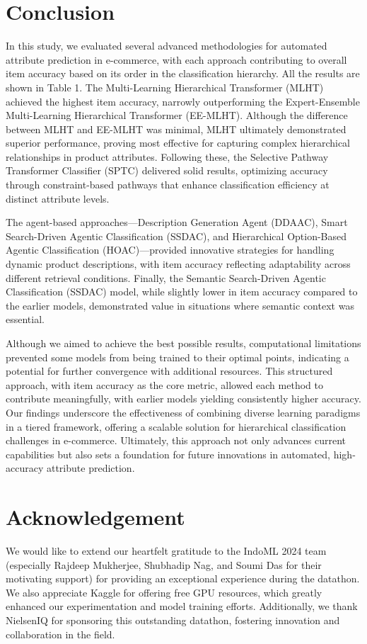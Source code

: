\documentclass[9pt,a4paper,twoside]{rho-class/rho}
\begin{document}
\section{Conclusion}
In this study, we evaluated several advanced methodologies for automated attribute prediction in e-commerce, with each approach contributing to overall item accuracy based on its order in the classification hierarchy. All the results are shown in Table 1. The Multi-Learning Hierarchical Transformer (MLHT) achieved the highest item accuracy, narrowly outperforming the Expert-Ensemble Multi-Learning Hierarchical Transformer (EE-MLHT). Although the difference between MLHT and EE-MLHT was minimal, MLHT ultimately demonstrated superior performance, proving most effective for capturing complex hierarchical relationships in product attributes. Following these, the Selective Pathway Transformer Classifier (SPTC) delivered solid results, optimizing accuracy through constraint-based pathways that enhance classification efficiency at distinct attribute levels.

The agent-based approaches—Description Generation Agent (DDAAC), Smart Search-Driven Agentic Classification (SSDAC), and Hierarchical Option-Based Agentic Classification (HOAC)—provided innovative strategies for handling dynamic product descriptions, with item accuracy reflecting adaptability across different retrieval conditions. Finally, the Semantic Search-Driven Agentic Classification (SSDAC) model, while slightly lower in item accuracy compared to the earlier models, demonstrated value in situations where semantic context was essential.

Although we aimed to achieve the best possible results, computational limitations prevented some models from being trained to their optimal points, indicating a potential for further convergence with additional resources. This structured approach, with item accuracy as the core metric, allowed each method to contribute meaningfully, with earlier models yielding consistently higher accuracy. Our findings underscore the effectiveness of combining diverse learning paradigms in a tiered framework, offering a scalable solution for hierarchical classification challenges in e-commerce. Ultimately, this approach not only advances current capabilities but also sets a foundation for future innovations in automated, high-accuracy attribute prediction.

\section{Acknowledgement}
We would like to extend our heartfelt gratitude to the IndoML 2024 team (especially Rajdeep Mukherjee, Shubhadip Nag, and Soumi Das for their motivating support) for providing an exceptional experience during the datathon. We also appreciate Kaggle for offering free GPU resources, which greatly enhanced our experimentation and model training efforts. Additionally, we thank NielsenIQ for sponsoring this outstanding datathon, fostering innovation and collaboration in the field.
\end{document}
